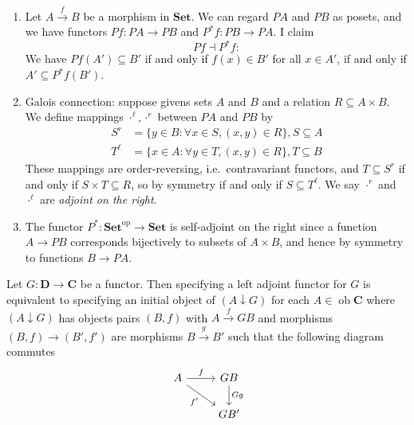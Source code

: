 \documentclass[a4paper]{article}
\renewcommand{\c}[1]{\mathbf{#1}}
\DeclareMathOperator{\ob}{ob}
\newcommand{\Set}{{\c{Set}}}
\newcommand{\adjoint}{\dashv}
\begin{document}
\begin{eg}
\begin{enumerate}
  \item Let \(A \xrightarrow{f} B\) be a morphism in \(\Set\). We can regard \(PA\) and \(PB\) as posets, and we have functors \(Pf: PA \to PB\) and \(P^*f: PB \to PA\). I claim
    \[
      Pf \adjoint P^*f:
    \]
    We have \(Pf(A') \subseteq B'\) if and only if \(f(x) \in B'\) for all \(x \in A'\), if and only if \(A' \subseteq P^*f(B')\).
  \item Galois connection: suppose givens sets \(A\) and \(B\) and a relation \(R \subseteq A \times B\). We define mappings \(\cdot^\ell, \cdot^r\) between \(PA\) and \(PB\)  by
    \begin{align*}
      S^r &= \{y \in B: \forall x \in S, (x, y) \in R\}, S \subseteq A \\
      T^\ell &= \{x \in A: \forall y \in T, (x, y) \in R\}, T \subseteq B
    \end{align*}
    These mappings are order-reversing, i.e.\ contravariant functors, and \(T\subseteq S^r\) if and only if \(S \times T \subseteq R\), so by symmetry if and only if \(S \subseteq T^\ell\). We say \(\cdot^r\) and \(\cdot^\ell\) are \emph{adjoint on the right}.
  \item The functor \(P^*: \Set^{\text{op}} \to \Set\) is self-adjoint on the right since a function \(A \to PB\) corresponds bijectively to subsets of \(A \times B\), and hence by symmetry to functions \(B \to PA\). %
  \end{enumerate}
\end{eg}

\begin{theorem}
  \label{thm:unit-counit characterisation of adjunction}
  Let \(G: \c D \to \c C\) be a functor. Then specifying a left adjoint functor for \(G\) is equivalent to specifying an initial object of \((A \downarrow G)\) for each \(A \in \ob \c C\) where \((A \downarrow G)\) has objects pairs \((B, f)\) with \(A \xrightarrow{f} GB\) and morphisms \((B, f) \to (B', f')\) are morphisms \(B \xrightarrow{g} B'\) such that the following diagram commutes
  \[
    \begin{tikzcd}
      A \ar[r, "f"] \ar[dr, "f'"'] & GB \ar[d, "Gg"] \\
      & GB'
    \end{tikzcd}
  \]
\end{theorem}
\end{document}
